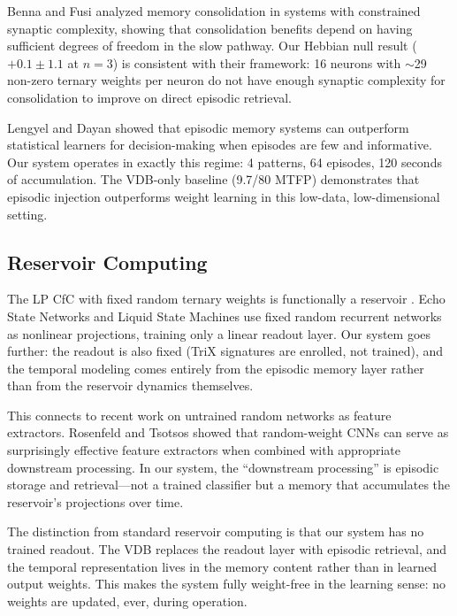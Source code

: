 \documentclass[11pt,letterpaper]{article}
\begin{document}
Benna and Fusi \cite{benna2016} analyzed memory consolidation in systems with constrained synaptic complexity, showing that consolidation benefits depend on having sufficient degrees of freedom in the slow pathway. Our Hebbian null result ($+0.1 \pm 1.1$ at $n=3$) is consistent with their framework: 16 neurons with $\sim$29 non-zero ternary weights per neuron do not have enough synaptic complexity for consolidation to improve on direct episodic retrieval.

Lengyel and Dayan \cite{lengyel2007} showed that episodic memory systems can outperform statistical learners for decision-making when episodes are few and informative. Our system operates in exactly this regime: 4 patterns, 64 episodes, 120 seconds of accumulation. The VDB-only baseline (9.7/80 MTFP) demonstrates that episodic injection outperforms weight learning in this low-data, low-dimensional setting.

\subsection{Reservoir Computing}

The LP CfC with fixed random ternary weights is functionally a reservoir \cite{jaeger2001echo,maass2002real}. Echo State Networks \cite{jaeger2001echo} and Liquid State Machines \cite{maass2002real} use fixed random recurrent networks as nonlinear projections, training only a linear readout layer. Our system goes further: the readout is also fixed (TriX signatures are enrolled, not trained), and the temporal modeling comes entirely from the episodic memory layer rather than from the reservoir dynamics themselves.

This connects to recent work on untrained random networks as feature extractors. Rosenfeld and Tsotsos \cite{rosenfeld2019intriguing} showed that random-weight CNNs can serve as surprisingly effective feature extractors when combined with appropriate downstream processing. In our system, the ``downstream processing'' is episodic storage and retrieval---not a trained classifier but a memory that accumulates the reservoir's projections over time.

The distinction from standard reservoir computing is that our system has no trained readout. The VDB replaces the readout layer with episodic retrieval, and the temporal representation lives in the memory content rather than in learned output weights. This makes the system fully weight-free in the learning sense: no weights are updated, ever, during operation.
\end{document}

